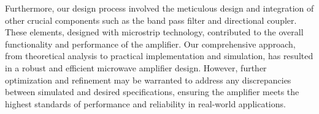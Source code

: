 \documentclass[12pt]{report} %
\begin{document}
Furthermore, our design process involved the meticulous design and integration of other crucial components such as the band pass filter and directional coupler. These elements, designed with microstrip technology, contributed to the overall functionality and performance of the amplifier. Our comprehensive approach, from theoretical analysis to practical implementation and simulation, has resulted in a robust and efficient microwave amplifier design. However, further optimization and refinement may be warranted to address any discrepancies between simulated and desired specifications, ensuring the amplifier meets the highest standards of performance and reliability in real-world applications.



\clearpage
{}
\printbibliography



\end{document}
